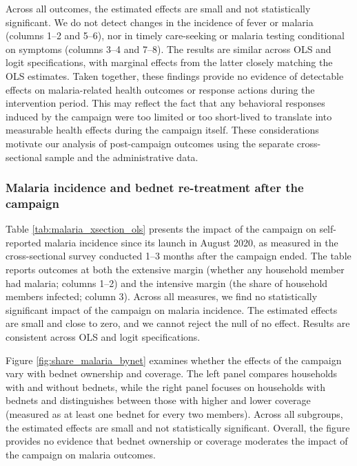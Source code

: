 Across all outcomes, the estimated effects are small and not statistically significant. We do not detect changes in the incidence of fever or malaria (columns 1--2 and 5--6), nor in timely care-seeking or malaria testing conditional on symptoms (columns 3--4 and 7--8). The results are similar across OLS and logit specifications, with marginal effects from the latter closely matching the OLS estimates. Taken together, these findings provide no evidence of detectable effects on malaria-related health outcomes or response actions during the intervention period. This may reflect the fact that any behavioral responses induced by the campaign were too limited or too short-lived to translate into measurable health effects during the campaign itself. These considerations motivate our analysis of post-campaign outcomes using the separate cross-sectional sample and the administrative data.





\subsubsection{Malaria incidence and bednet re-treatment after the campaign}

Table \ref{tab:malaria_xsection_ols} presents the impact of the campaign on self-reported malaria incidence since its launch in August 2020, as measured in the cross-sectional survey conducted 1–3 months after the campaign ended. The table reports outcomes at both the extensive margin (whether any household member had malaria; columns 1–2) and the intensive margin (the share of household members infected; column 3). Across all measures, we find no statistically significant impact of the campaign on malaria incidence. The estimated effects are small and close to zero, and we cannot reject the null of no effect. Results are consistent across OLS and logit specifications.

Figure \ref{fig:share_malaria_bynet} examines whether the effects of the campaign vary with bednet ownership and coverage. The left panel compares households with and without bednets, while the right panel focuses on households with bednets and distinguishes between those with higher and lower coverage (measured as at least one bednet for every two members). Across all subgroups, the estimated effects are small and not statistically significant. Overall, the figure provides no evidence that bednet ownership or coverage moderates the impact of the campaign on malaria outcomes.


